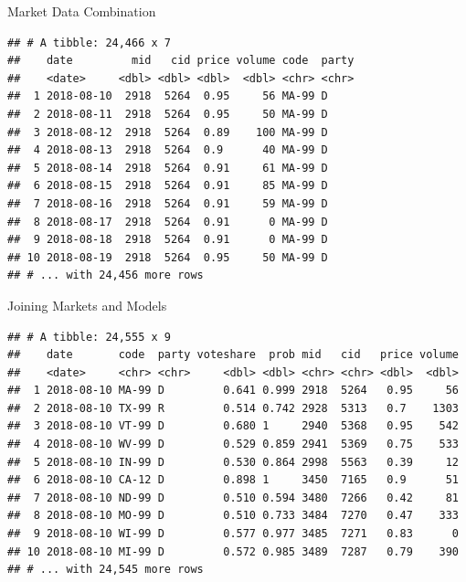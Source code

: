 \documentclass[ignorenonframetext,]{beamer}
\begin{document}
\begin{frame}[fragile]{Market Data Combination}

\begin{verbatim}
## # A tibble: 24,466 x 7
##    date         mid   cid price volume code  party
##    <date>     <dbl> <dbl> <dbl>  <dbl> <chr> <chr>
##  1 2018-08-10  2918  5264  0.95     56 MA-99 D    
##  2 2018-08-11  2918  5264  0.95     50 MA-99 D    
##  3 2018-08-12  2918  5264  0.89    100 MA-99 D    
##  4 2018-08-13  2918  5264  0.9      40 MA-99 D    
##  5 2018-08-14  2918  5264  0.91     61 MA-99 D    
##  6 2018-08-15  2918  5264  0.91     85 MA-99 D    
##  7 2018-08-16  2918  5264  0.91     59 MA-99 D    
##  8 2018-08-17  2918  5264  0.91      0 MA-99 D    
##  9 2018-08-18  2918  5264  0.91      0 MA-99 D    
## 10 2018-08-19  2918  5264  0.95     50 MA-99 D    
## # ... with 24,456 more rows
\end{verbatim}

\end{frame}

\begin{frame}[fragile]{Joining Markets and Models}

\begin{verbatim}
## # A tibble: 24,555 x 9
##    date       code  party voteshare  prob mid   cid   price volume
##    <date>     <chr> <chr>     <dbl> <dbl> <chr> <chr> <dbl>  <dbl>
##  1 2018-08-10 MA-99 D         0.641 0.999 2918  5264   0.95     56
##  2 2018-08-10 TX-99 R         0.514 0.742 2928  5313   0.7    1303
##  3 2018-08-10 VT-99 D         0.680 1     2940  5368   0.95    542
##  4 2018-08-10 WV-99 D         0.529 0.859 2941  5369   0.75    533
##  5 2018-08-10 IN-99 D         0.530 0.864 2998  5563   0.39     12
##  6 2018-08-10 CA-12 D         0.898 1     3450  7165   0.9      51
##  7 2018-08-10 ND-99 D         0.510 0.594 3480  7266   0.42     81
##  8 2018-08-10 MO-99 D         0.510 0.733 3484  7270   0.47    333
##  9 2018-08-10 WI-99 D         0.577 0.977 3485  7271   0.83      0
## 10 2018-08-10 MI-99 D         0.572 0.985 3489  7287   0.79    390
## # ... with 24,545 more rows
\end{verbatim}

\end{frame}
\end{document}
